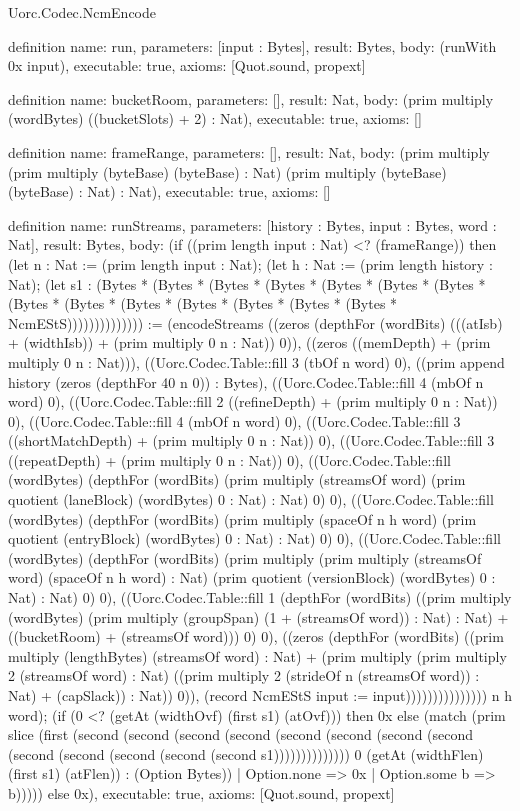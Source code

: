 \begin{lexlean}{Uorc.Codec.NcmEncode}
\begin{semanticmodule}
definition{
  name: run,
  parameters: [input : Bytes],
  result: Bytes,
  body: (runWith 0x input),
  executable: true,
  axioms: [Quot.sound, propext]
}

definition{
  name: bucketRoom,
  parameters: [],
  result: Nat,
  body: (prim multiply (wordBytes) ((bucketSlots) + 2) : Nat),
  executable: true,
  axioms: []
}

definition{
  name: frameRange,
  parameters: [],
  result: Nat,
  body: (prim multiply (prim multiply (byteBase) (byteBase) : Nat) (prim multiply (byteBase) (byteBase) : Nat) : Nat),
  executable: true,
  axioms: []
}

definition{
  name: runStreams,
  parameters: [history : Bytes, input : Bytes, word : Nat],
  result: Bytes,
  body: (if ((prim length input : Nat) <? (frameRange)) then (let n : Nat := (prim length input : Nat); (let h : Nat := (prim length history : Nat); (let s1 : (Bytes * (Bytes * (Bytes * (Bytes * (Bytes * (Bytes * (Bytes * (Bytes * (Bytes * (Bytes * (Bytes * (Bytes * (Bytes * (Bytes * NcmEStS)))))))))))))) := (encodeStreams ((zeros (depthFor (wordBits) (((atIsb) + (widthIsb)) + (prim multiply 0 n : Nat)) 0)), ((zeros ((memDepth) + (prim multiply 0 n : Nat))), ((Uorc.Codec.Table::fill 3 (tbOf n word) 0), ((prim append history (zeros (depthFor 40 n 0)) : Bytes), ((Uorc.Codec.Table::fill 4 (mbOf n word) 0), ((Uorc.Codec.Table::fill 2 ((refineDepth) + (prim multiply 0 n : Nat)) 0), ((Uorc.Codec.Table::fill 4 (mbOf n word) 0), ((Uorc.Codec.Table::fill 3 ((shortMatchDepth) + (prim multiply 0 n : Nat)) 0), ((Uorc.Codec.Table::fill 3 ((repeatDepth) + (prim multiply 0 n : Nat)) 0), ((Uorc.Codec.Table::fill (wordBytes) (depthFor (wordBits) (prim multiply (streamsOf word) (prim quotient (laneBlock) (wordBytes) 0 : Nat) : Nat) 0) 0), ((Uorc.Codec.Table::fill (wordBytes) (depthFor (wordBits) (prim multiply (spaceOf n h word) (prim quotient (entryBlock) (wordBytes) 0 : Nat) : Nat) 0) 0), ((Uorc.Codec.Table::fill (wordBytes) (depthFor (wordBits) (prim multiply (prim multiply (streamsOf word) (spaceOf n h word) : Nat) (prim quotient (versionBlock) (wordBytes) 0 : Nat) : Nat) 0) 0), ((Uorc.Codec.Table::fill 1 (depthFor (wordBits) ((prim multiply (wordBytes) (prim multiply (groupSpan) (1 + (streamsOf word)) : Nat) : Nat) + ((bucketRoom) + (streamsOf word))) 0) 0), ((zeros (depthFor (wordBits) ((prim multiply (lengthBytes) (streamsOf word) : Nat) + (prim multiply (prim multiply 2 (streamsOf word) : Nat) ((prim multiply 2 (strideOf n (streamsOf word)) : Nat) + (capSlack)) : Nat)) 0)), (record NcmEStS {input := input}))))))))))))))) n h word); (if (0 <? (getAt (widthOvf) (first s1) (atOvf))) then 0x else (match (prim slice (first (second (second (second (second (second (second (second (second (second (second (second (second (second s1)))))))))))))) 0 (getAt (widthFlen) (first s1) (atFlen)) : (Option Bytes))
    | Option.none => 0x
    | Option.some b => b))))) else 0x),
  executable: true,
  axioms: [Quot.sound, propext]
}


\end{semanticmodule}
\end{lexlean}
